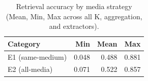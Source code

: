 \begin{table}[ht]
\centering
\caption{Retrieval accuracy by media strategy (Mean, Min, Max across all K, aggregation, and extractors).}
\label{tab:by_media}
\small
\begin{tabular}{@{}lrrr@{}}
\toprule
Category & Min & Mean & Max \\
\midrule
E1 (same-medium) & 0.048 & 0.488 & 0.881 \\
E2 (all-media) & 0.071 & 0.522 & 0.857 \\
\bottomrule
\end{tabular}
\end{table}

